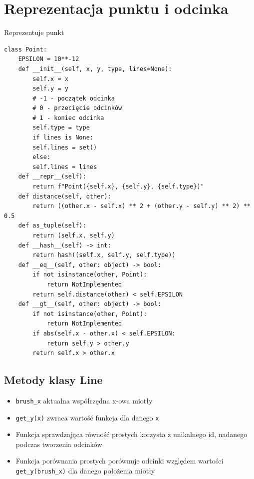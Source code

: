 \documentclass[12pt]{article}
\begin{document}
\newpage
\section*{Reprezentacja punktu i odcinka}
		\par Reprezentuje punkt
		\begin{Verbatim}
class Point:
	EPSILON = 10**-12
	def __init__(self, x, y, type, lines=None):
		self.x = x
		self.y = y
		# -1 - początek odcinka
		# 0 - przecięcie odcinków
		# 1 - koniec odcinka
		self.type = type
		if lines is None:
		self.lines = set()
		else:
		self.lines = lines
	def __repr__(self):
		return f"Point({self.x}, {self.y}, {self.type})"
	def distance(self, other):
		return ((other.x - self.x) ** 2 + (other.y - self.y) ** 2) ** 0.5
	def as_tuple(self):
		return (self.x, self.y)
	def __hash__(self) -> int:
		return hash((self.x, self.y, self.type))
	def __eq__(self, other: object) -> bool:
		if not isinstance(other, Point):
			return NotImplemented
		return self.distance(other) < self.EPSILON
	def __gt__(self, other: object) -> bool:
		if not isinstance(other, Point):
			return NotImplemented
		if abs(self.x - other.x) < self.EPSILON:
			return self.y > other.y
		return self.x > other.x
		\end{Verbatim}
		
		\subsection*{Metody klasy Line}
\begin{itemize}
	\item \verb|brush_x| aktualna współrzędna x-owa miotły
	\item \verb|get_y(x)| zwraca wartość funkcja dla danego \verb|x|
	\item Funkcja sprawdzająca równość prostych korzysta z unikalnego id, nadanego podczas tworzenia odcinków
	\item Funkcja porównania prostych porównuje odcinki względem wartości \verb|get_y(brush_x)| dla danego położenia miotły
\end{itemize}
\end{document}
